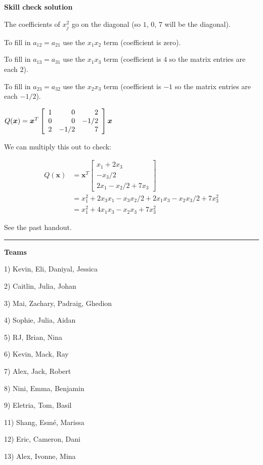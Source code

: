 \documentclass[12pt,letterpaper,noanswers]{exam}
\newcommand{\vc}[1]{\boldsymbol{#1}}
\begin{document}
\noindent \textbf{Skill check solution}
\begin{questions}
\item The coefficients of $x_j^2$ go on the diagonal (so $1$, $0$, $7$ will be the diagonal).

To fill in $a_{12} = a_{21}$ use the $x_1x_2$ term (coefficient is zero).

To fill in $a_{13} = a_{31}$ use the $x_1x_3$ term (coefficient is $4$ so the matrix entries are each $2$).

To fill in $a_{23} = a_{32}$ use the $x_2x_3$ term (coefficient is $-1$ so the matrix entries are each $-1/2$).


$Q(\vc{x}) = \vc{x}^T\left[\begin{array}{r r r} 
1 & 0 & 2 \\
0 & 0 & -1/2 \\
2 & -1/2 & 7
\end{array}\right] \vc{x}$

We can multiply this out to check:

\begin{align*}
    Q(\vc{x}) &= \vc{x}^T\left[\begin{array}{c}
x_1 + 2x_3 \\
-x_3/2 \\
2x_1 - x_2/2 + 7x_3
\end{array}
\right] \\
&= x_1^2 + 2x_3x_1 - x_3x_2/2 + 2x_1x_3-x_2x_3/2 + 7x_3^2 \\
&= x_1^2 + 4x_1x_3 - x_2x_3 + 7x_3^2
\end{align*}

\item See the past handout.
\end{questions}
\vspace{0.2cm}
\hrule
\vspace{0.2cm}

\noindent \textbf{Teams}

\begin{multicols}{3}
1) Kevin, Eli, Daniyal, Jessica

2) Caitlin, Julia, Johan

3) Mai, Zachary, Padraig, Ghedion

4) Sophie, Julia, Aidan

5) RJ, Brian, Nina

6) Kevin, Mack, Ray

7) Alex, Jack, Robert

8) Nini, Emma, Benjamin

9) Eletria, Tom, Basil

11) Shang, Esmé, Marissa

12) Eric, Cameron, Dani

13) Alex, Ivonne, Mina
\end{multicols}
\end{document}
